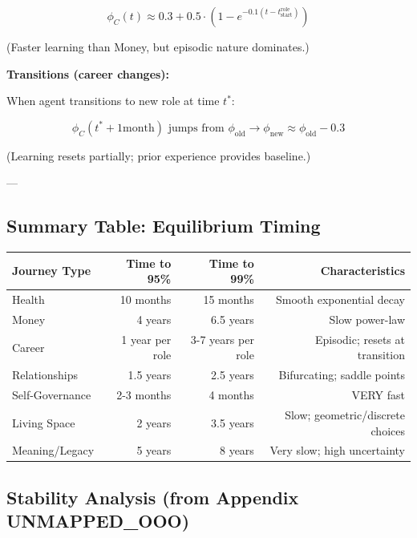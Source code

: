 {{\begin{equation}
\phi_C(t) \approx 0.3 + 0.5 \cdot \left(1 - e^{-0.1(t - t_{\text{start}}^{\text{role}})}\right)
\end{equation}

(Faster learning than Money, but episodic nature dominates.)

\textbf{Transitions (career changes):}

When agent transitions to new role at time $t^*$:

\begin{equation}
\phi_C(t^* + 1\text{month}) \text{ jumps from } \phi_{\text{old}} \to \phi_{\text{new}} \approx \phi_{\text{old}} - 0.3
\end{equation}

(Learning resets partially; prior experience provides baseline.)

---

\subsection{Summary Table: Equilibrium Timing}

\begin{center}
\small
\begin{tabular}{@{}lrrr@{}}
\toprule
\textbf{Journey Type} & \textbf{Time to 95\%} & \textbf{Time to 99\%} & \textbf{Characteristics} \\
\midrule
Health & ~10 months & ~15 months & Smooth exponential decay \\
Money & ~4 years & ~6.5 years & Slow power-law \\
Career & ~1 year per role & 3-7 years per role & Episodic; resets at transition \\
Relationships & ~1.5 years & ~2.5 years & Bifurcating; saddle points \\
Self-Governance & ~2-3 months & ~4 months & VERY fast \\
Living Space & ~2 years & ~3.5 years & Slow; geometric/discrete choices \\
Meaning/Legacy & ~5 years & ~8 years & Very slow; high uncertainty \\
\midrule
\end{tabular}
\end{center}

\subsection{Stability Analysis (from Appendix UNMAPPED_OOO)}

}}
